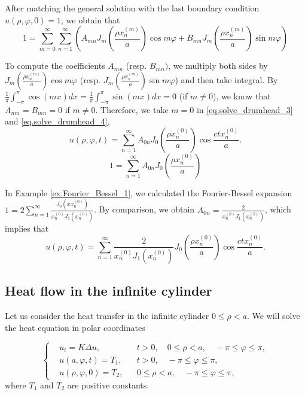 After matching the general solution with the last boundary condition $u(\rho, \varphi, 0)=1$, we obtain that 
\begin{equation}\label{eq.solve_drumhead_4}
    1 = \sum_{m=0}^{\infty} \sum_{n=1}^{\infty}\left(A_{m n} J_m\left(\frac{\rho x_n^{(m)}}{a}\right) \cos m \varphi+B_{m n} J_m\left(\frac{\rho x_n^{(m)}}{a}\right) \sin m \varphi\right)
\end{equation}

To compute the coefficients $A_{m n}$ (resp. $B_{m n})$, we multiply both sides by $J_m\left(\frac{\rho x_n^{(m)}}{a}\right) \cos m \varphi$ (resp. $J_m\left(\frac{\rho x_n^{(m)}}{a}\right) \sin m \varphi$) and then take integral. By $\frac{1}{\pi} \int_{-\pi}^\pi \cos (m x) d x = \frac{1}{\pi} \int_{-\pi}^\pi \sin (m x) d x = 0$ (if $m\neq 0$), we know that $A_{m n} = B_{m n} = 0$ if $m\neq 0$. Therefore, we take $m = 0$ in \eqref{eq.solve_drumhead_3} and \eqref{eq.solve_drumhead_4},
$$
u(\rho, \varphi, t)=\sum_{n=1}^{\infty} A_{0 n} J_0\left(\frac{\rho x_n^{(0)}}{a}\right) \cos \frac{c t x_n^{(0)}}{a} .
$$
\[
    1 = \sum_{n=1}^{\infty} A_{0 n} J_0\left(\frac{\rho x_n^{(0)}}{a}\right)
\]


In Example \ref{ex.Fourier_Bessel_1}, we calculated the Fourier-Bessel expansion $1=2 \sum_{n=1}^{\infty} \frac{J_0\left(x x_n^{(0)}\right)}{x_n^{(0)} J_1\left(x_n^{(0)}\right)}$. By comparison, we obtain $A_{0n} = \frac{2}{x_n^{(0)} J_1\left(x_n^{(0)}\right)}$, which implies that
$$
u(\rho, \varphi, t)=\sum_{n=1}^{\infty} \frac{2}{x_n^{(0)} J_1\left(x_n^{(0)}\right)} J_0\left(\frac{\rho x_n^{(0)}}{a}\right) \cos \frac{c t x_n^{(0)}}{a} .
$$

\subsection{Heat flow in the infinite cylinder}
Let us consider the heat transfer in the infinite cylinder $0 \leq \rho<a$. We will solve the heat equation in polar coordinates

$$
\left\{\begin{aligned}
&u_t=K \Delta u, && t>0, \quad 0 \leq \rho<a, \quad-\pi \leq \varphi \leq \pi, 
\\
&u\left(a, \varphi, t\right)=T_1, && t>0, \quad-\pi \leq \varphi \leq \pi, 
\\
&u(\rho, \varphi, 0)=T_2, && 0 \leq \rho<a, \quad-\pi \leq \varphi \leq \pi,
\end{aligned}\right.
$$
where $T_1$ and $T_2$ are positive constants.

